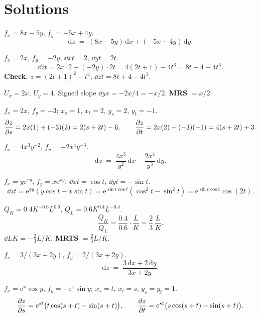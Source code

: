\section{Solutions}

\begin{solutions}
  \item $f_{x}=8x-5y$, $f_{y}=-5x+4y$.
        \[
          \mathrm{d}z \;=\; (8x-5y)\,\mathrm{d}x+(-5x+4y)\,\mathrm{d}y .
        \]

  \item $f_{x}=2x$, $f_{y}=-2y$, $\dd{x}{t}=2$, $\dd{y}{t}=2t$.
        \[
          \dd{z}{t}=2x\cdot 2+(-2y)\cdot 2t=4(2t+1)-4t^{3}=8t+4-4t^{3} .
        \]
        \textbf{Check.} $z=(2t+1)^{2}-t^{4}$, $\dd{z}{t}=8t+4-4t^{3}$.
        \checkmark

  \item $U_{x}=2x$, $U_{y}=4$. Signed slope $\dd{y}{x}=-2x/4=-x/2$.
        \textbf{MRS} $=x/2$.

  \item $f_{x}=2x$, $f_{y}=-3$; $x_{s}=1$, $x_{t}=2$, $y_{s}=2$,
        $y_{t}=-1$.
        \[
          \frac{\partial z}{\partial s}=2x(1)+(-3)(2)=2(s+2t)-6,\qquad
          \frac{\partial z}{\partial t}=2x(2)+(-3)(-1)=4(s+2t)+3 .
        \]

  \item $f_{x}=4x^{3}y^{-2}$, $f_{y}=-2x^{4}y^{-3}$.
        \[
          \mathrm{d}z \;=\; \frac{4x^{3}}{y^{2}}\,\mathrm{d}x
            -\frac{2x^{4}}{y^{3}}\,\mathrm{d}y .
        \]

  \item $f_{x}=y\mathrm{e}^{xy}$, $f_{y}=x\mathrm{e}^{xy}$;
        $\dd{x}{t}=\cos t$, $\dd{y}{t}=-\sin t$.
        \[
          \dd{z}{t}=\mathrm{e}^{xy}(y\cos t-x\sin t)
            =\mathrm{e}^{\sin t\cos t}(\cos^{2}t-\sin^{2}t)
            =\mathrm{e}^{\sin t\cos t}\cos(2t) .
        \]

  \item $Q_{K}=0.4K^{-0.6}L^{0.6}$, $Q_{L}=0.6K^{0.4}L^{-0.4}$.
        \[
          \frac{Q_{K}}{Q_{L}}=\frac{0.4}{0.6}\cdot\frac{L}{K}
            =\frac{2}{3}\,\frac{L}{K} .
        \]
        $\dd{L}{K}=-\tfrac{2}{3}L/K$. \textbf{MRTS} $=\tfrac{2}{3}L/K$.

  \item $f_{x}=3/(3x+2y)$, $f_{y}=2/(3x+2y)$.
        \[
          \mathrm{d}z \;=\; \frac{3\,\mathrm{d}x+2\,\mathrm{d}y}{3x+2y} .
        \]

  \item $f_{x}=\mathrm{e}^{x}\cos y$, $f_{y}=-\mathrm{e}^{x}\sin y$;
        $x_{s}=t$, $x_{t}=s$, $y_{s}=y_{t}=1$.
        \[
          \frac{\partial z}{\partial s}=\mathrm{e}^{st}\bigl(t\cos(s+t)-\sin(s+t)\bigr),\qquad
          \frac{\partial z}{\partial t}=\mathrm{e}^{st}\bigl(s\cos(s+t)-\sin(s+t)\bigr) .
        \]


\end{solutions}
